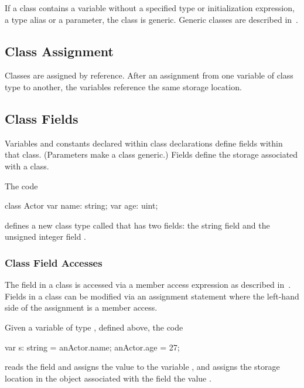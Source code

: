 If a class contains a variable without a specified type or
initialization expression, a type alias or a parameter, the class is
generic.  Generic classes are described in~.

\subsection{Class Assignment}
\label{Class_Assignment}

Classes are assigned by reference.  After an assignment from one
variable of class type to another, the variables reference the same
storage location.

\subsection{Class Fields}
\label{Class_Fields}

Variables and constants declared within class declarations define
fields within that class.  (Parameters make a class generic.)  Fields
define the storage associated with a class.

\begin{example}
The code
\begin{chapel}
class Actor {
  var name: string;
  var age: uint;
}
\end{chapel}
defines a new class type called  that has two fields: the
string field  and the unsigned integer field .
\end{example}

\subsubsection{Class Field Accesses}
\label{Class_Field_Accesses}

The field in a class is accessed via a member access expression as
described in~.  Fields in a class can
be modified via an assignment statement where the left-hand side of
the assignment is a member access.
\begin{example}
Given a variable  of type , defined above,
the code
\begin{chapel}
var s: string = anActor.name;
anActor.age = 27;
\end{chapel}
reads the field  and assigns the value to the variable
, and assigns the storage location in the object
 associated with the field  the value
.
\end{example}


